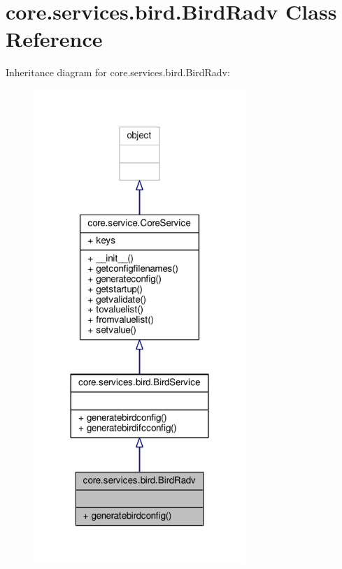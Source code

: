 \hypertarget{classcore_1_1services_1_1bird_1_1_bird_radv}{\section{core.\+services.\+bird.\+Bird\+Radv Class Reference}
\label{classcore_1_1services_1_1bird_1_1_bird_radv}
}


Inheritance diagram for core.\+services.\+bird.\+Bird\+Radv\+:
\nopagebreak
\begin{figure}[H]
\begin{center}
\leavevmode
\includegraphics[width=227pt]{classcore_1_1services_1_1bird_1_1_bird_radv__inherit__graph}
\end{center}
\end{figure}



